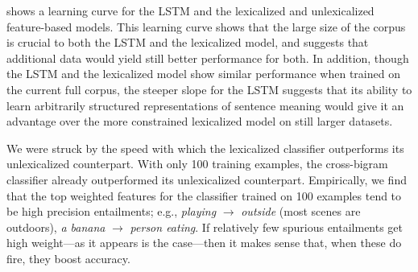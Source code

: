  shows a learning curve for the LSTM and the lexicalized and unlexicalized feature-based models. This learning curve shows that the large size of the corpus is crucial to both the LSTM and the lexicalized model, and suggests that additional data would yield still better performance for both. In addition, though the LSTM and the lexicalized model show similar performance when trained on the current full corpus, the steeper slope for the LSTM suggests that its ability to learn arbitrarily structured representations of sentence meaning would give it an advantage over the more constrained lexicalized model on still larger datasets.



We were struck by the speed with which the lexicalized classifier outperforms its unlexicalized counterpart.
With only 100 training examples, the cross-bigram classifier already outperformed its unlexicalized counterpart.
Empirically, we find that the top weighted features for the classifier
  trained on 100 examples tend to be high precision entailments;
  e.g.,
  \textit{playing} $\rightarrow$ \textit{outside}
  (most scenes are outdoors), \textit{a banana} $\rightarrow$
  \textit{person eating}.
If relatively few spurious entailments get high weight---as it appears
is the case---then it makes sense that, when these do fire, they
boost accuracy.
  
